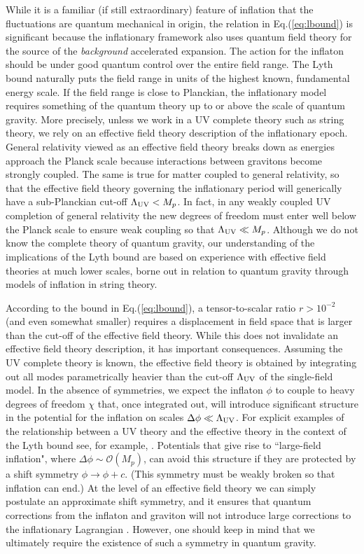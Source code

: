 While it is a familiar (if still extraordinary) feature of inflation that the fluctuations are quantum mechanical in origin, the relation in Eq.(\ref{eq:lbound}) is significant because the inflationary framework also uses quantum field theory for the source of the {\it background} accelerated expansion. The action for the inflaton should be under good quantum control over the entire field range. The Lyth bound naturally puts the field range in units of the highest known, fundamental energy scale. If the field range is close to Planckian, the inflationary model requires something of the quantum theory up to or above the scale of quantum gravity. More precisely, unless we work in a UV complete theory such as string theory, we rely on an effective field theory description of the inflationary epoch. General relativity viewed as an effective field theory breaks down as energies approach the Planck scale because interactions between gravitons become strongly coupled. The same is true for matter coupled to general relativity, so that the effective field theory governing the inflationary period will generically have a sub-Planckian cut-off $\Lambda_{\rm UV}<M_p$. In fact, in any weakly coupled UV completion of general relativity the new degrees of freedom must enter well below the Planck scale to ensure weak coupling so that $\Lambda_{\rm UV}\ll M_p$. Although we do not know the complete theory of quantum gravity, our understanding of the implications of the Lyth bound are based on experience with effective field theories at much lower scales, borne out in relation to quantum gravity through models of inflation in string theory.

According to the bound in Eq.(\ref{eq:lbound}), a tensor-to-scalar ratio $r>10^{-2}$ (and even somewhat smaller) requires a displacement in field space that is larger than the cut-off of the effective field theory. While this does not invalidate an effective field theory description, it has important consequences. Assuming the UV complete theory is known, the effective field theory is obtained by integrating out all modes parametrically heavier than the cut-off $\Lambda_{\rm UV}$ of the single-field model. In the absence of symmetries, we expect the inflaton $\phi$ to couple to heavy degrees of freedom $\chi$ that, once integrated out, will introduce significant structure in the potential for the inflation on scales $\Delta\phi\ll \Lambda_{\rm UV}$. For explicit examples of the relationship between a UV theory and the effective theory in the context of the Lyth bound see, for example, \cite{Baumann:2014nda}. Potentials that give rise to ``large-field inflation", where $\Delta\phi\sim\mathcal{O}(M_p)$, can avoid this structure if they are protected by a shift symmetry $\phi\rightarrow\phi+c$. (This symmetry must be weakly broken so that inflation can end.) At the level of an effective field theory we can simply postulate an approximate shift symmetry, and it ensures that quantum corrections from the inflaton and graviton will not introduce large corrections to the inflationary Lagrangian \cite{Linde:2005ht, Kaloper:2011jz, Csaki:2014bua,Kaplan:2015fuy,Choi:2015fiu}. However, one should keep in mind that we ultimately require the existence of such a symmetry in quantum gravity. 

